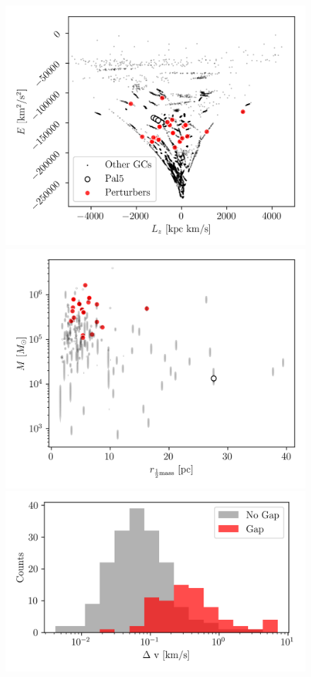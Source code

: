 \documentclass[draft]{aa}
\begin{document}
    \begin{figure}
      \centering
      \includegraphics[width=1\linewidth]{E_Lz_perturbers.png}
      \includegraphics[width=1\linewidth]{mass_size_plane.png}
      \includegraphics[width=1\linewidth]{impact_geometry_statistics_deltaP.png}

\end{figure}
\end{document}
